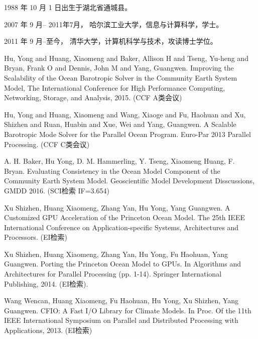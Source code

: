 \begin{resume}


  1988 年 10 月 1 日出生于湖北省通城县。

  2007 年 9 月-- 2011年7月， 哈尔滨工业大学，信息与计算科学，学士。

  2011 年 9 月--至今， 清华大学，计算机科学与技术，攻读博士学位。


  \begin{publications}
    \item Hu, Yong and Huang, Xiaomeng and Baker, Allison H and Tseng, Yu-heng and Bryan, Frank O and Dennis, John M and Yang, Guangwen. Improving the Scalability of the Ocean Barotropic Solver in the Community Earth System Model, The International Conference for High Performance Computing, Networking, Storage, and Analysis, 2015.  (CCF A类会议)
    \item  Hu, Yong and Huang, Xiaomeng and Wang, Xiaoge and Fu, Haohuan and Xu, Shizhen and Ruan, Huabin and Xue, Wei and Yang, Guangwen. A Scalable Barotropic Mode Solver for the Parallel Ocean Program. Euro-Par 2013 Parallel Processing. (CCF C类会议) 
  \end{publications}

  \begin{publications}[before=\publicationskip,after=\publicationskip]
    \item A. H. Baker, Hu Yong, D. M. Hammerling, Y. Tseng, Xiaomeng Huang, F. Bryan. Evaluating Consistency in the Ocean Model Component of the Community Earth System Model. Geoscientific Model Development Disscussions, GMDD 2016. (SCI检索 IF=3.654)
  \end{publications}

  \begin{publications}
    \item Xu Shizhen, Huang Xiaomeng, Zhang Yan, Hu Yong, Yang Guangwen. A Customized GPU Acceleration of the Princeton Ocean Model. The 25th IEEE International Conference on Application-specific Systems, Architectures and Processors. (EI检索)
     \item  Xu Shizhen, Huang Xiaomeng, Zhang Yan, Hu Yong, Fu Haohuan,  Yang Guangwen. Porting the Princeton Ocean Model to GPUs. In Algorithms and Architectures for Parallel Processing (pp. 1-14). Springer International Publishing, 2014. (EI检索).
    \item Wang Wencan, Huang Xiaomeng, Fu Haohuan, Hu Yong, Xu Shizhen, Yang Guangwen. CFIO: A Fast I/O Library for Climate Models. In Proc. Of the 11th IEEE International Symposium on Parallel and Distributed Processing with Applications, 2013. (EI检索)
    

\end{publications}
\end{resume}
